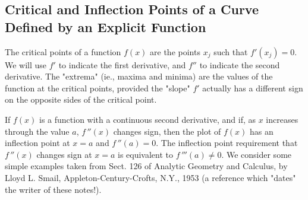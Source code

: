 \documentclass[12pt]{article}
\begin{document}
\subsection{Critical and Inflection Points of a Curve Defined by an Explicit Function}
The critical points of a function $f(x)$ are the points $x_{j}$ such that $f'(x_{j})=0$.
We will use $f'$ to indicate the first derivative, and $f''$ to indicate the second
  derivative.
The "extrema" (ie., maxima and minima) are the values of the function at the
  critical points, provided the "slope" $f'$ actually has a different sign on
  the opposite sides of the critical point.
\begin{center}
\end{center}

\smallskip
If $f(x)$ is a function with a continuous second derivative, and if, as $x$ increases
  through the value $a$, $f\,''(x)$  changes sign, then the plot of $f(x)$ has an
  inflection point at $x=a$ and $f\,''(a) = 0$.
The inflection point requirement that $f\,''(x)$ changes sign at $x = a$ is equivalent
  to $f\,'''(a) \ne 0 $.
We consider some simple examples taken from Sect. 126 of Analytic Geometry and Calculus,
  by Lloyd L. Smail, Appleton-Century-Crofts, N.Y., 1953 (a reference which "dates" the writer
    of these notes!). 
  
\end{document}
